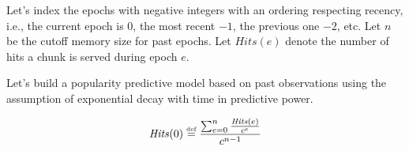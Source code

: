 
Let's  index  the epochs with negative integers with an ordering respecting recency, i.e., the current epoch is 0, the most recent $-1$, the previous one $-2$, etc. 
Let $n$ be the cutoff memory size for past epochs.
Let $\mathit{Hits}(e)$ denote the number of hits a chunk is served during epoch $e$. 

Let's build a popularity predictive model based on past observations using the assumption of exponential decay with time in predictive power. 

\begin{equation}
    \mathit{Hits}(0) \overset{\textrm{\tiny def}}{=} \frac{\sum_{e=0}^n \frac{\mathit{Hits}(e)}{c^e}}{c^{n-1}}
\end{equation}